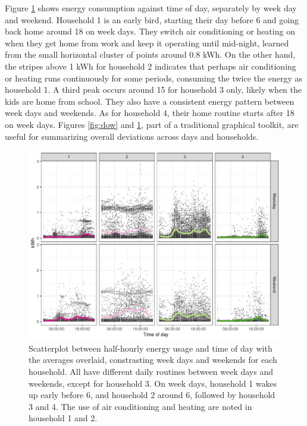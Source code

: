 \documentclass[12pt]{article}
\begin{document}
Figure \ref{fig:hod} shows energy consumption against time of day, separately by week day and weekend. Household 1 is an early bird, starting their day before 6 and going back home around 18 on week days. They switch air conditioning or heating on when they get home from work and keep it operating until mid-night, learned from the small horizontal cluster of points around 0.8 kWh. On the other hand, the stripes above 1 kWh for household 2 indicates that perhaps air conditioning or heating runs continuously for some periods, consuming the twice the energy as household 1. A third peak occurs around 15 for household 3 only, likely when the kids are home from school. They also have a consistent energy pattern between week days and weekends. As for household 4, their home routine starts after 18 on week days. Figures \ref{fig:dow} and \ref{fig:hod}, part of a traditional graphical toolkit, are useful for summarizing overall deviations across days and households.

\begin{figure}

{\centering \includegraphics[width=\textwidth]{figure/hod-1} 

}

\caption{Scatterplot between half-hourly energy usage and time of day with the averages overlaid, constrasting week days and weekends for each household. All have different daily routines between week days and weekends, except for household 3. On week days, household 1 wakes up early before 6, and household 2 around 6, followed by household 3 and 4. The use of air conditioning and heating are noted in household 1 and 2.}\label{fig:hod}
\end{figure}
\end{document}
